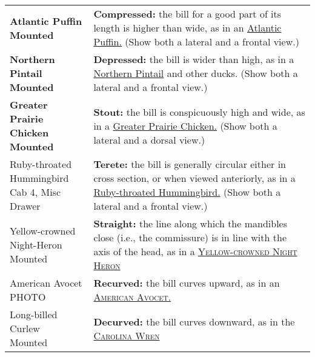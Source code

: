 \documentclass[10pt]{article}
\newif\ifprintkey
\newcommand{\PrintKey}[1]{\ifprintkey{\textbf{#1}}\fi}
\begin{document}
\begin{longtable}{@{}C{0.45\textwidth}L{0.45\textwidth}@{}}
\PrintKey{\textbf{Atlantic Puffin \newline Mounted}} & 
\textbf{Compressed:} the bill for a good part of its length is higher than wide, as in an %
\href{https://www.allaboutbirds.org/guide/Atlantic_Puffin}{Atlantic Puffin.} (Show both a lateral and a frontal view.)\\ [2.5cm]
%
\PrintKey{\textbf{Northern Pintail \newline Mounted}}& 
\textbf{Depressed:} the bill is wider than high, as in a \href{https://www.allaboutbirds.org/guide/Northern_Pintail}{Northern Pintail} and other ducks. (Show both a lateral and a frontal view.)\\ [2.5cm]
%
\PrintKey{\textbf{Greater Prairie Chicken \newline Mounted}} & 
\textbf{Stout:} the bill is conspicuously high and wide, as in a \href{https://www.allaboutbirds.org/guide/Greater_Prairie-Chicken}{Greater Prairie Chicken.} 
(Show both a lateral and a dorsal view.)\\ [2.5cm]
%
\PrintKey{Ruby-throated Hummingbird \newline Cab 4, Misc Drawer} & 
\textbf{Terete:} the bill is generally circular either in cross section, or when viewed anteriorly, as in a \href{https://www.allaboutbirds.org/guide/Ruby-throated_Hummingbird}{Ruby-throated Hummingbird.} (Show both a lateral and a frontal view.)\\ [2.5cm]
%
\PrintKey{Yellow-crowned Night-Heron \newline Mounted}%
& \textbf{Straight:} the line along which the mandibles close (i.e., the commissure) is in line with the axis of the head, as in a \href{https://www.allaboutbirds.org/guide/Yellow-crowned_Night_Heron}{\textsc{Yellow-crowned Night Heron}} \\ [2.5cm]
%
\PrintKey{American Avocet \newline PHOTO} %
& \textbf{Recurved:} the bill curves upward, as in an \href{https://www.allaboutbirds.org/guide/American_Avocet}{\textsc{American Avocet.}} %
\\ [2.5cm]
%
\PrintKey{Long-billed Curlew \newline Mounted} & 
\textbf{Decurved:} the bill curves downward, as in the \href{https://www.allaboutbirds.org/guide/Carolina_Wren}{\textsc{Carolina Wren}} %

\end{longtable}
\end{document}
